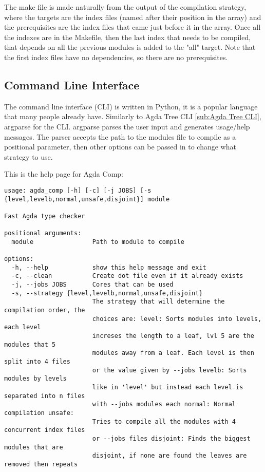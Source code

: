 The make file is made naturally from the output of the compilation strategy,
where the targets are the index files (named after their position in the array)
and the prerequisites are the index files that came just before it in the
array. Once all the indexes are in the Makefile, then the last index that needs
to be compiled, that depends on all the previous modules is added to the "all"
target. Note that the first index files have no dependencies, so there are no
prerequisites.


\subsection{Command Line Interface}

The command line interface (CLI) is written in Python, it is a popular language
that many people already have. Similarly to Agda Tree CLI \cref{sub:Agda Tree
CLI}, argparse for the CLI. argparse parses the user input and generates
usage/help messages. The parser accepts the path to the modules file to compile
as a positional parameter, then other options can be passed in to change what
strategy to use.

This is the help page for Agda Comp:
\begin{lstlisting}
usage: agda_comp [-h] [-c] [-j JOBS] [-s {level,levelb,normal,unsafe,disjoint}] module

Fast Agda type checker

positional arguments:
  module                Path to module to compile

options:
  -h, --help            show this help message and exit
  -c, --clean           Create dot file even if it already exists
  -j, --jobs JOBS       Cores that can be used
  -s, --strategy {level,levelb,normal,unsafe,disjoint}
                        The strategy that will determine the compilation order, the
                        choices are: level: Sorts modules into levels, each level
                        increses the length to a leaf, lvl 5 are the modules that 5
                        modules away from a leaf. Each level is then split into 4 files
                        or the value given by --jobs levelb: Sorts modules by levels
                        like in 'level' but instead each level is separated into n files
                        with --jobs modules each normal: Normal compilation unsafe:
                        Tries to compile all the modules with 4 concurrent index files
                        or --jobs files disjoint: Finds the biggest modules that are
                        disjoint, if none are found the leaves are removed then repeats
\end{lstlisting}

